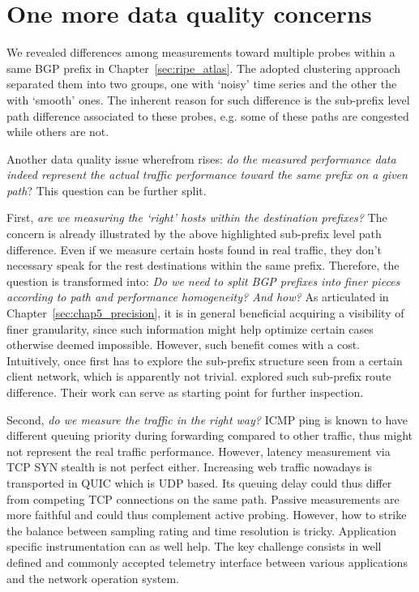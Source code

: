 \iffalse
\section{One more data quality concerns}
We revealed differences among measurements toward multiple probes within a same BGP prefix in Chapter~\ref{sec:ripe_atlas}. The adopted clustering approach separated them into two groups, one with `noisy' time series and the other the with `smooth' ones. The inherent reason for such difference is the sub-prefix level path difference associated to these probes, e.g. some of these paths are congested while others are not.

Another data quality issue wherefrom rises: \textit{do the measured performance data indeed represent the actual traffic performance toward the same prefix on a given path}?
This question can be further split. 

First, \textit{are we measuring the `right' hosts within the destination prefixes?} The concern is already illustrated by the above highlighted sub-prefix level path difference. Even if we measure certain hosts found in real traffic, they don't necessary speak for the rest destinations within the same prefix.
Therefore, the question is transformed into: \textit{Do we need to split BGP prefixes into finer pieces according to path and performance homogeneity? And how?}
As articulated in Chapter~\ref{sec:chap5_precision}, it is in general beneficial acquiring a visibility of finer granularity, since such information might help optimize certain cases otherwise deemed impossible.
However, such benefit comes with a cost. Intuitively, once first has to explore the sub-prefix structure seen from a certain client network, which is apparently not trivial.
\citet{Lee2016} explored such sub-prefix route difference. Their work can serve as starting point for further inspection.

Second, \textit{do we measure the traffic in the right way?} ICMP ping is known to have different queuing priority during forwarding compared to other traffic, thus might not represent the real traffic performance. However, latency measurement via TCP SYN stealth is not perfect either. Increasing web traffic nowadays is transported in QUIC which is UDP based. Its queuing delay could thus differ from competing TCP connections on the same path.
Passive measurements are more faithful and could thus complement active probing. However, how to strike the balance between sampling rating and time resolution is tricky.
Application specific instrumentation can as well help. The key challenge consists in well defined and commonly accepted telemetry interface between various applications and the network operation system.


